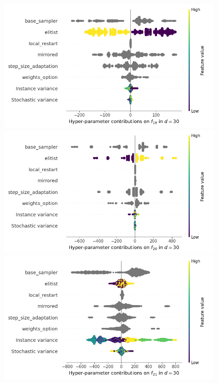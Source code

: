 \begin{figure}[t]
	\includegraphics[height=0.15\textheight,trim=60mm 0mm 30mm 0mm,clip]{images/img_summary_f19_d30.png}
	\includegraphics[height=0.15\textheight,trim=60mm 0mm 0mm 0mm,clip]{images/img_summary_f20_d30.png}
	\includegraphics[height=0.15\textheight,trim=0mm 0mm 30mm 0mm,clip]{images/img_summary_f21_d30.png}

\end{figure}
